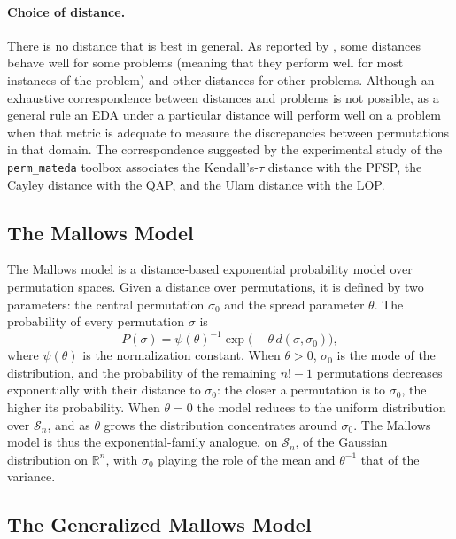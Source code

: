 \documentclass[a4paper,11pt]{article}
\begin{document}
\paragraph{Choice of distance.}
There is no distance that is best in general.  As reported by
\cite{Ceberio_et_al:2015}, some distances behave well for some problems
(meaning that they perform well for most instances of the problem) and other
distances for other problems.  Although an exhaustive correspondence between
distances and problems is not possible, as a general rule an EDA under a
particular distance will perform well on a problem when that metric is adequate
to measure the discrepancies between permutations in that domain.  The
correspondence suggested by the experimental study of the \texttt{perm\_mateda}
toolbox associates the Kendall's-$\tau$ distance with the PFSP, the Cayley
distance with the QAP, and the Ulam distance with the LOP.

\subsection{The Mallows Model}

The Mallows model \citep{Mallows:1957} is a distance-based exponential
probability model over permutation spaces.  Given a distance over permutations,
it is defined by two parameters: the central permutation $\sigma_0$ and the
spread parameter $\theta$.  The probability of every permutation $\sigma$ is
\begin{equation}
P(\sigma) = \psi(\theta)^{-1} \exp\big(-\theta\, d(\sigma, \sigma_0)\big) ,
\label{eq:mallows}
\end{equation}
where $\psi(\theta)$ is the normalization constant.  When $\theta>0$, $\sigma_0$
is the mode of the distribution, and the probability of the remaining $n!-1$
permutations decreases exponentially with their distance to $\sigma_0$: the
closer a permutation is to $\sigma_0$, the higher its probability.  When
$\theta=0$ the model reduces to the uniform distribution over $\mathcal{S}_n$,
and as $\theta$ grows the distribution concentrates around $\sigma_0$.  The
Mallows model is thus the exponential-family analogue, on $\mathcal{S}_n$, of the
Gaussian distribution on $\mathbb{R}^n$, with $\sigma_0$ playing the role of the
mean and $\theta^{-1}$ that of the variance.

\subsection{The Generalized Mallows Model}
\end{document}
